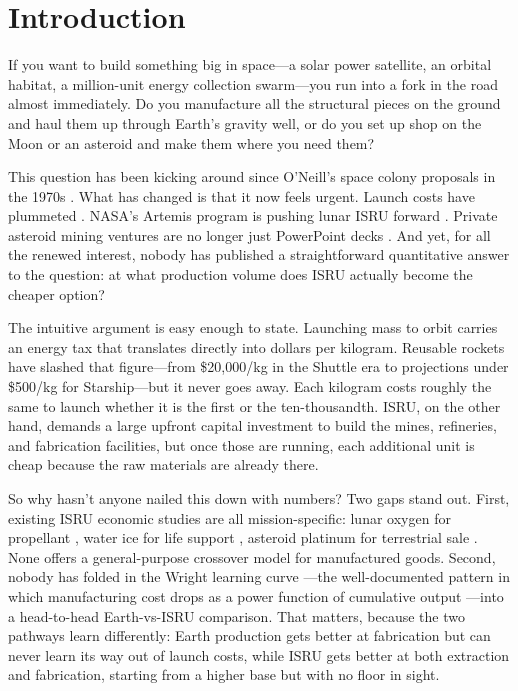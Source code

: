 \documentclass[preprint,12pt]{elsarticle}
\begin{document}
\linenumbers

\section{Introduction}
\label{sec:introduction}

If you want to build something big in space---a solar power satellite, an orbital habitat, a million-unit energy collection swarm---you run into a fork in the road almost immediately. Do you manufacture all the structural pieces on the ground and haul them up through Earth's gravity well, or do you set up shop on the Moon or an asteroid and make them where you need them?

This question has been kicking around since O'Neill's space colony proposals in the 1970s \cite{oneill1976,oneill1977}. What has changed is that it now feels urgent. Launch costs have plummeted \cite{jones2018}. NASA's Artemis program is pushing lunar ISRU forward \cite{sanders2015}. Private asteroid mining ventures are no longer just PowerPoint decks \cite{elvis2012,andrews2015}. And yet, for all the renewed interest, nobody has published a straightforward quantitative answer to the question: at what production volume does ISRU actually become the cheaper option?

The intuitive argument is easy enough to state. Launching mass to orbit carries an energy tax that translates directly into dollars per kilogram. Reusable rockets have slashed that figure---from \$20{,}000/kg in the Shuttle era to projections under \$500/kg for Starship---but it never goes away. Each kilogram costs roughly the same to launch whether it is the first or the ten-thousandth. ISRU, on the other hand, demands a large upfront capital investment to build the mines, refineries, and fabrication facilities, but once those are running, each additional unit is cheap because the raw materials are already there.

So why hasn't anyone nailed this down with numbers? Two gaps stand out. First, existing ISRU economic studies are all mission-specific: lunar oxygen for propellant \cite{sanders2015}, water ice for life support \cite{zubrin1996}, asteroid platinum for terrestrial sale \cite{sonter1997,elvis2012}. None offers a general-purpose crossover model for manufactured goods. Second, nobody has folded in the Wright learning curve \cite{wright1936}---the well-documented pattern in which manufacturing cost drops as a power function of cumulative output \cite{wertz2011}---into a head-to-head Earth-vs-ISRU comparison. That matters, because the two pathways learn differently: Earth production gets better at fabrication but can never learn its way out of launch costs, while ISRU gets better at both extraction and fabrication, starting from a higher base but with no floor in sight.
\end{document}
